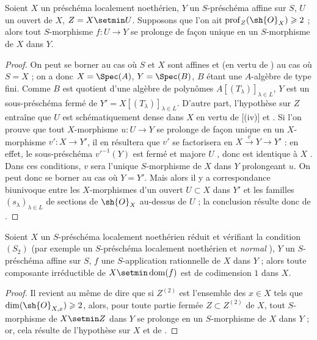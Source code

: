 \begin{proposition}[20.4.11]
\label{IV.20.4.11}
Soient $X$ un préschéma localement noethérien, $Y$ un $S$-préschéma affine sur $S$, $U$ un ouvert de $X$, $Z=X\setmin U$.
Supposons que l'on ait $\operatorname{prof}_Z(\sh{O}_X)\geq 2$  ; alors tout $S$-morphisme $f:U\to Y$ se prolonge de façon unique en un $S$-morphisme de $X$ dans $Y$.
\end{proposition}

\begin{proof}
On peut se borner au cas où $S$ et $X$ sont affines et (en vertu de ) au cas où $S=X$ ; on a donc $X=\Spec(A)$, $Y=\Spec(B)$, $B$ étant une $A$-algèbre de type fini.
Comme $B$ est quotient d'une algèbre de polynômes $A[(T_\lambda)]_{\lambda\in L}$, $Y$ est un sous-préschéma fermé de $Y'=X[(T_\lambda)]_{\lambda\in L}$.
D'autre part, l'hypothèse sur $Z$ entraîne que $U$ est schématiquement dense dans $X$ en vertu de [(iv)] et .
Si l'on prouve que tout $X$-morphisme $u:U\to Y$ se prolonge de façon unique en un $X$-morphisme $v':X\to Y'$, il en résultera que $v'$ se factorisera en $X\xrightarrow{v}Y\to Y'$ : en effet, le sous-préschéma $v'^{-1}(Y)$ est fermé et majore $U$ , donc est identique à $X$ .
Dans ces conditions, $v$ sera l'unique $S$-morphisme de $X$ dans $Y$ prolongeant $u$.
On peut donc se borner au cas où $Y=Y'$.
Mais alors il y a correspondance biunivoque entre les $X$-morphismes d'un ouvert $U\subset X$ dans $Y'$ et les familles $(s_\lambda)_{\lambda\in L}$ de sections de $\sh{O}_X$ au-dessus de $U$  ; la conclusion résulte donc de .
\end{proof}

\begin{corollary}[20.4.12]
\label{IV.20.4.12}
Soient $X$ un $S$-préschéma localement noethérien réduit et vérifiant la condition $(S_2)$  \textup{(par exemple un $S$-préschéma localement noethérien et \emph{normal} )}, $Y$ un $S$-préschéma affine sur $S$, $f$ une $S$-application rationnelle de $X$ dans $Y$ ; alors toute composante irréductible de $X\setmin\operatorname{dom}(f)$ est de codimension $1$ dans $X$.
\end{corollary}

\begin{proof}
Il revient au même de dire que si $Z^{(2)}$ est l'ensemble des $x\in X$ tels que $\dim(\sh{O}_{X,x})\geq 2$, alors, pour toute partie fermée $Z\subset Z^{(2)}$ de $X$, tout $S$-morphisme de $X\setmin Z$ dans $Y$ se prolonge en un $S$-morphisme de $X$ dans $Y$ ; or, cela résulte de l'hypothèse sur $X$  et de .
\end{proof}

